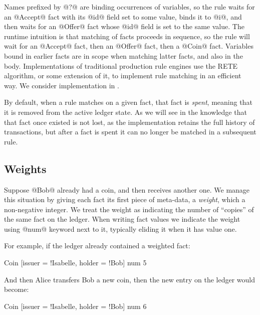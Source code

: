 Names prefixed by @?@ are binding occurrences of variables, so the rule waits for an @Accept@ fact with its @id@ field set to some value, binds it to @i@, and then waits for an @Offer@ fact whose @id@ field is set to the same value. The runtime intuition is that matching of facts proceeds in sequence, so the rule will wait for an @Accept@ fact, then an @Offer@ fact, then a @Coin@ fact. Variables bound in earlier facts are in scope when matching latter facts, and also in the body. Implementations of traditional production rule engines use the RETE~\cite{Forgy1981:RETE} algorithm, or some extension of it, to implement rule matching in an efficient way. We consider implementation in \REF.

By default, when a rule matches on a given fact, that fact is \emph{spent}, meaning that it is removed from the active ledger state. As we will see in \REF the knowledge that that fact once existed is not lost, as the implementation retains the full history of transactions, but after a fact is spent it can no longer be matched in a subsequent rule.


\subsection{Weights}
\label{s:Weights}
Suppose @Bob@ already had a coin, and then receives another one. We manage this situation by giving each fact its first piece of meta-data, a \emph{weight}, which a non-negative integer. We treat the weight as indicating the number of ``copies'' of the same fact on the ledger. When writing fact values we indicate the weight using @num@ keyword next to it, typically eliding it when it has value one.

For example, if the ledger already contained a weighted fact:
\begin{small}
\begin{code}
 Coin [issuer = !Isabelle, holder = !Bob] num 5
\end{code}
\end{small}
%
And then Alice transfers Bob a new coin, then the new entry on the ledger would become:
\begin{small}
\begin{code}
 Coin [issuer = !Isabelle, holder = !Bob] num 6
\end{code}
\end{small}
%


